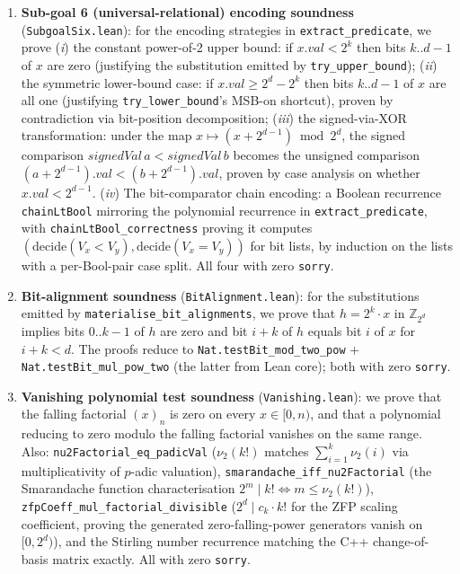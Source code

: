 \documentclass[runningheads]{llncs}
\begin{document}
\begin{enumerate}
\item \textbf{Sub-goal 6 (universal-relational) encoding
  soundness} (\texttt{SubgoalSix.lean}): for the encoding
  strategies in \texttt{extract\_predicate}, we prove
  (\emph{i}) the constant power-of-2 upper bound: if
  $x.\mathit{val} < 2^k$ then bits $k..d-1$ of $x$ are zero
  (justifying the substitution emitted by
  \texttt{try\_upper\_bound});
  (\emph{ii}) the symmetric lower-bound case: if $x.\mathit{val} \ge 2^d - 2^k$
  then bits $k..d-1$ of $x$ are all one (justifying \texttt{try\_lower\_bound}'s
  MSB-on shortcut), proven by contradiction via bit-position
  decomposition;
  (\emph{iii}) the signed-via-XOR transformation: under the map
  $x \mapsto (x + 2^{d-1}) \bmod 2^d$, the signed comparison
  $\mathit{signedVal}\,a < \mathit{signedVal}\,b$ becomes the unsigned
  comparison $(a + 2^{d-1}).\mathit{val} < (b + 2^{d-1}).\mathit{val}$,
  proven by case analysis on whether $x.\mathit{val} < 2^{d-1}$.
  (\emph{iv}) The bit-comparator chain encoding: a Boolean
  recurrence \texttt{chainLtBool} mirroring the polynomial
  recurrence in \texttt{extract\_predicate}, with
  \texttt{chainLtBool\_correctness} proving it computes
  $(\mathrm{decide}(V_x < V_y), \mathrm{decide}(V_x = V_y))$ for
  bit lists, by induction on the lists with a per-Bool-pair case
  split. All four with zero \texttt{sorry}.

\item \textbf{Bit-alignment soundness} (\texttt{BitAlignment.lean}):
  for the substitutions emitted by \texttt{materialise\_bit\_alignments},
  we prove that $h = 2^k \cdot x$ in $\mathbb{Z}_{2^d}$ implies
  bits $0..k-1$ of $h$ are zero and bit $i+k$ of $h$ equals bit
  $i$ of $x$ for $i + k < d$. The proofs reduce to
  \texttt{Nat.testBit\_mod\_two\_pow} +
  \texttt{Nat.testBit\_mul\_pow\_two} (the latter from Lean
  core); both with zero \texttt{sorry}.

\item \textbf{Vanishing polynomial test soundness}
  (\texttt{Vanishing.lean}): we prove that the falling factorial
  $(x)_n$ is zero on every $x \in [0, n)$, and that a polynomial
  reducing to zero modulo the falling factorial vanishes on the
  same range. Also: \texttt{nu2Factorial\_eq\_padicVal}
  ($\nu_2(k!)$ matches $\sum_{i=1}^{k} \nu_2(i)$ via
  multiplicativity of $p$-adic valuation),
  \texttt{smarandache\_iff\_nu2Factorial} (the Smarandache
  function characterisation $2^m \mid k! \iff m \leq \nu_2(k!)$),
  \texttt{zfpCoeff\_mul\_factorial\_divisible}
  ($2^d \mid c_k \cdot k!$ for the ZFP scaling coefficient,
  proving the generated zero-falling-power generators vanish on
  $[0, 2^d)$), and the Stirling number recurrence matching the
  C++ change-of-basis matrix exactly. All with zero \texttt{sorry}.


\end{enumerate}
\end{document}

